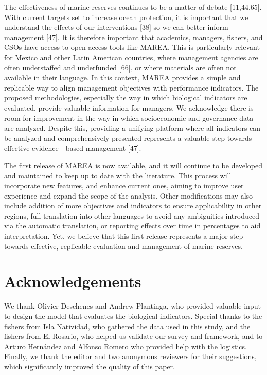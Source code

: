 \documentclass[12pt,]{article}
\begin{document}
The effectiveness of marine reserves continues to be a matter of debate
{[}11,44,65{]}. With current targets set to increase ocean protection,
it is important that we understand the effects of our interventions
{[}38{]} so we can better inform management {[}47{]}. It is therefore
important that academics, managers, fishers, and CSOs have access to
open access tools like MAREA. This is particularly relevant for Mexico
and other Latin American countries, where management agencies are often
understaffed and underfunded {[}66{]}, or where materials are often not
available in their language. In this context, MAREA provides a simple
and replicable way to align management objectives with performance
indicators. The proposed methodologies, especially the way in which
biological indicators are evaluated, provide valuable information for
managers. We acknowledge there is room for improvement in the way in
which socioeconomic and governance data are analyzed. Despite this,
providing a unifying platform where all indicators can be analyzed and
comprehensively presented represents a valuable step towards effective
evidence---based management {[}47{]}.

The first release of MAREA is now available, and it will continue to be
developed and maintained to keep up to date with the literature. This
process will incorporate new features, and enhance current ones, aiming
to improve user experience and expand the scope of the analysis. Other
modifications may also include addition of more objectives and
indicators to ensure applicability in other regions, full translation
into other languages to avoid any ambiguities introduced via the
automatic translation, or reporting effects over time in percentages to
aid interpretation. Yet, we believe that this first release represents a
major step towards effective, replicable evaluation and management of
marine reserves.

\section{Acknowledgements}\label{acknowledgements}

We thank Olivier Deschenes and Andrew Plantinga, who provided valuable
input to design the model that evaluates the biological indicators.
Special thanks to the fishers from Isla Natividad, who gathered the data
used in this study, and the fishers from El Rosario, who helped us
validate our survey and framework, and to Arturo Hernández and Alfonso
Romero who provided help with the logistics. Finally, we thank the
editor and two anonymous reviewers for their suggestions, which
significantly improved the quality of this paper.
\end{document}
